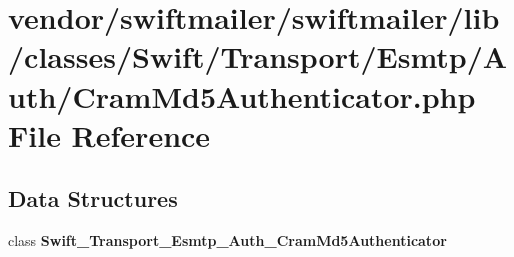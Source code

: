 \section{vendor/swiftmailer/swiftmailer/lib/classes/\+Swift/\+Transport/\+Esmtp/\+Auth/\+Cram\+Md5\+Authenticator.php File Reference}
\label{_cram_md5_authenticator_8php}
\subsection*{Data Structures}
\begin{DoxyCompactItemize}
\item 
class {\bf Swift\+\_\+\+Transport\+\_\+\+Esmtp\+\_\+\+Auth\+\_\+\+Cram\+Md5\+Authenticator}
\end{DoxyCompactItemize}
